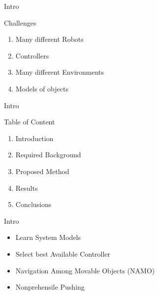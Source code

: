 \begin{frame}[c]{Intro} 
  \begin{block}{Challenges}
    \begin{enumerate}
      \item Many different Robots
      \item Controllers 
      \item Many different Environments
      \item Models of objects
    \end{enumerate}
  \end{block}
\end{frame}

\begin{frame}[c]{Intro} 
  \begin{block}{Table of Content}
    \begin{enumerate}
      \item Introduction
      \item Required Background
      \item Proposed Method
      \item Results
      \item Conclusions
    \end{enumerate}
  \end{block}
\end{frame}

\begin{frame}[fragile]{Intro} 
\begin{block}{}
\begin{itemize}
  \item Learn System Models\\
  \item Select best Available Controller
\end{itemize}
  \end{block}\pause

\begin{block}{}
\begin{itemize}
  \item Navigation Among Movable Objects (NAMO)\\
  \item Nonprehensile Pushing
\end{itemize}
  \end{block}
\end{frame}





